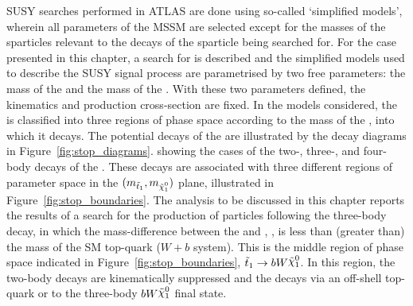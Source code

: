 SUSY searches performed in ATLAS are done using so-called `simplified models', wherein all parameters
of the MSSM are selected except for the masses of the sparticles relevant to the decays
of the sparticle being searched for.
For the case presented in this chapter, a search for \stopone is described and the simplified models
used to describe the SUSY signal process are parametrised by two free parameters: the mass of the 
\stopone and the mass of the \ninoone.
With these two parameters defined, the kinematics and production cross-section are fixed.
In the models considered, the \stopone is classified into three regions of phase space according
to the mass of the \ninoone, into which it decays.
The potential decays of the \stopone are illustrated by the decay diagrams in Figure~\ref{fig:stop_diagrams}.
showing the cases of the two-, three-, and four-body decays of the \stopone.
These decays are associated with three different regions of parameter space in the $(m_{\stopone}, m_{\ninoone})$ plane,
illustrated in Figure~\ref{fig:stop_boundaries}.
The analysis to be discussed in this chapter reports the results of a search for the production
of \stopone particles following the three-body decay, in which the mass-difference between the \stopone
and \ninoone, \sdiff, is less than (greater than) the mass of the SM top-quark ($W+b$ system).
This is the middle region of phase space indicated in Figure~\ref{fig:stop_boundaries}, $\stopone \rightarrow b W \ninoone$.
In this region, the two-body \stopone decays are kinematically suppressed and the \stopone decays via
an off-shell top-quark or \chinoonepm to the three-body $b W \ninoone$ final state.


